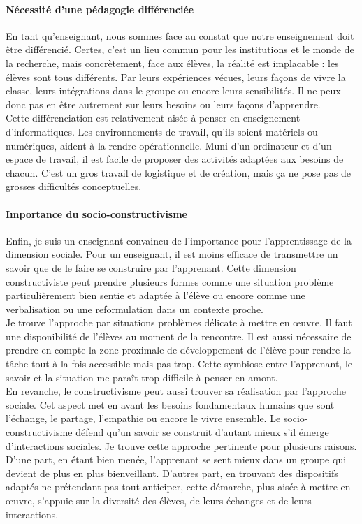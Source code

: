 \paragraph{Nécessité d'une pédagogie différenciée}
%
En tant qu'enseignant, nous sommes face au constat que notre enseignement doit être différencié. Certes, c'est un lieu commun pour les institutions et le monde de la recherche, mais concrètement, face aux élèves, la réalité est implacable : les élèves sont tous différents. Par leurs expériences vécues, leurs façons de vivre la classe, leurs intégrations dans le groupe ou encore leurs sensibilités. Il ne peux donc pas en être autrement sur leurs besoins ou leurs façons d'apprendre.
\\
Cette différenciation est relativement aisée à penser en enseignement d'informatiques. Les environnements de travail, qu'ils soient matériels ou numériques, aident à la rendre opérationnelle. Muni d'un ordinateur et d'un espace de travail, il est facile de proposer des activités adaptées aux besoins de chacun. C'est un gros travail de logistique et de création, mais ça ne pose pas de grosses difficultés conceptuelles.


\paragraph{Importance du socio-constructivisme}
%
Enfin, je suis un enseignant convaincu de l'importance pour l'apprentissage de la dimension sociale.  Pour un enseignant, il est moins efficace de transmettre un savoir que de le faire se construire par l'apprenant. Cette dimension constructiviste peut prendre plusieurs formes comme une situation problème particulièrement bien sentie et adaptée à l'élève ou encore comme une verbalisation ou une reformulation dans un contexte proche.
\\
Je trouve l'approche par situations problèmes délicate à mettre en œuvre. Il faut une disponibilité de l'élèves au moment de la rencontre. Il est aussi nécessaire de prendre en compte la zone proximale de développement de l'élève pour rendre la tâche tout à la fois accessible mais pas trop. Cette symbiose entre l'apprenant, le savoir et la situation me paraît trop difficile à penser en amont. 
\\
En revanche, le constructivisme peut aussi trouver sa réalisation par l'approche sociale. Cet aspect met en avant les besoins fondamentaux humains que sont l'échange, le partage, l'empathie ou encore le vivre ensemble. Le socio-constructivisme défend qu'un savoir se construit d'autant mieux s'il émerge d'interactions sociales. Je trouve cette approche pertinente pour plusieurs raisons. D'une part, en étant bien menée, l'apprenant se sent mieux dans un groupe qui devient de plus en plus bienveillant. D'autres part, en trouvant des dispositifs adaptés ne prétendant pas tout anticiper, cette démarche, plus aisée à mettre en œuvre, s'appuie sur la diversité des élèves, de leurs échanges et de leurs interactions.


